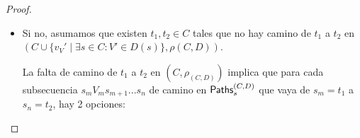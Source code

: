 \begin{proof}
\begin{itemize}
		      Para que valga que $\omega$ esté en $\Paths_s^{(C,D)}$ tiene que valer que en
		      infinitos momentos $i$ nos quedemos en $C$. Entonces que vale que $\Prob_s^\pi
			      (\omega \in \Paths_s^{(C,D)}) < r^k$ para todo $k > 0$ natural. Como sabemos
		      que $r < 1$, tenemos que $$\Prob^\pi_{\M, s}(\{ \omega \in \Paths_s \mid \omega
			      \in \Paths_s^{(C,D)}\}) = 0.$$








		\item Si no, asumamos que existen $t_1, t_2 \in C$ tales que no hay camino de $t_1$ a
		      $t_2$ en $(C \cup \{v_V' \mid \exists s \in C : V' \in D(s)\}, \rho(C,D))$.

		      La falta de camino de $t_1$ a $t_2$ en $(C, \rho_{(C,D)})$ implica que para
		      cada subsecuencia $s_m V_m s_{m+1} ... s_n$ de camino en $\Paths_s^{(C,D)}$ que
		      vaya de $s_m=t_1$ a $s_n=t_2$, hay 2 opciones:


\end{itemize}
\end{proof}
